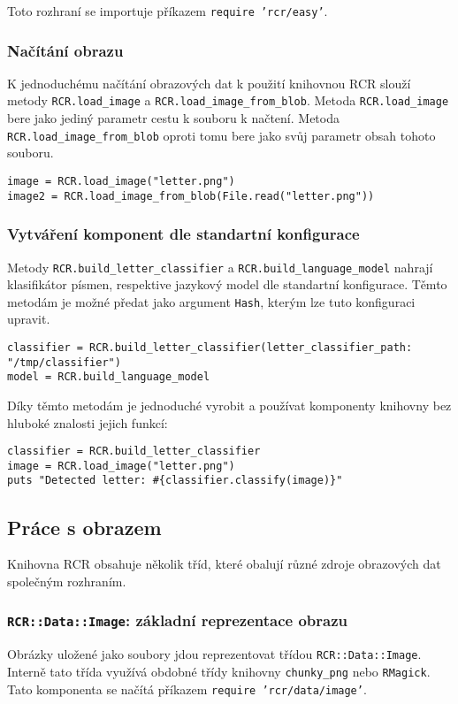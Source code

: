 \documentclass[a4paper]{article}
\begin{document}
Toto rozhraní se importuje příkazem \texttt{require 'rcr/easy'}.

\subsubsection{Načítání obrazu}
K jednoduchému načítání obrazových dat k použití knihovnou RCR slouží metody
\texttt{RCR.load\_image} a \texttt{RCR.load\_image\_from\_blob}. Metoda
\texttt{RCR.load\_image} bere jako jediný parametr cestu k souboru k načtení.
Metoda \texttt{RCR.load\_image\_from\_blob} oproti tomu bere jako svůj parametr
obsah tohoto souboru.
\begin{lstlisting}
image = RCR.load_image("letter.png")
image2 = RCR.load_image_from_blob(File.read("letter.png"))
\end{lstlisting}

\subsubsection{Vytváření komponent dle standartní konfigurace}
Metody \texttt{RCR.build\_letter\_classifier} a
\texttt{RCR.build\_language\_model} nahrají klasifikátor písmen, respektive jazykový model
dle standartní konfigurace. Těmto metodám je možné předat jako argument
\texttt{Hash}, kterým lze tuto konfiguraci upravit.
\begin{lstlisting}
classifier = RCR.build_letter_classifier(letter_classifier_path: "/tmp/classifier")
model = RCR.build_language_model
\end{lstlisting}

Díky těmto metodám je jednoduché vyrobit a používat komponenty knihovny
bez hluboké znalosti jejich funkcí:
\begin{lstlisting}
classifier = RCR.build_letter_classifier
image = RCR.load_image("letter.png")
puts "Detected letter: #{classifier.classify(image)}"
\end{lstlisting}

\subsection{Práce s obrazem}
Knihovna RCR obsahuje několik tříd, které obalují různé zdroje obrazových dat
společným rozhraním.

\subsubsection{\texttt{RCR::Data::Image}: základní reprezentace obrazu}
Obrázky uložené jako soubory jdou reprezentovat třídou
\texttt{RCR::Data::Image}. Interně tato třída využívá obdobné třídy knihovny
\texttt{chunky\_png} nebo \texttt{RMagick}.
Tato komponenta se načítá příkazem \texttt{require 'rcr/data/image'}.
\end{document}
